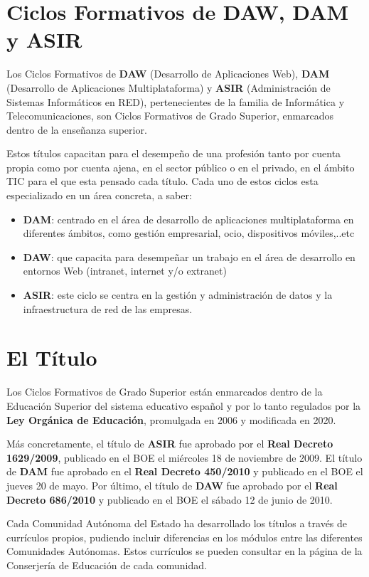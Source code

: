  \section{Ciclos Formativos de DAW, DAM y ASIR}
 Los Ciclos Formativos de {\bfseries DAW} (Desarrollo de Aplicaciones Web), {\bfseries DAM} (Desarrollo de Aplicaciones Multiplataforma) y {\bfseries ASIR} (Administración de Sistemas Informáticos en RED), pertenecientes de la familia de Informática y Telecomunicaciones, son Ciclos Formativos de Grado Superior, enmarcados dentro de la enseñanza superior.
 
 Estos títulos capacitan para el desempeño de una profesión tanto por cuenta propia como por cuenta ajena, en el sector público o en el privado, en el ámbito TIC para el que esta pensado cada título. Cada uno de estos ciclos esta especializado en un área concreta, a saber: 
 
 \begin{itemize}
 	\item {\bfseries DAM}: centrado en el área de desarrollo de aplicaciones multiplataforma en diferentes ámbitos, como gestión empresarial, ocio, dispositivos móviles,..etc
 	\item {\bfseries DAW}: que capacita para desempeñar un trabajo en el área de desarrollo en entornos Web (intranet, internet y/o extranet)
 	\item {\bfseries ASIR}: este ciclo se centra en la gestión y administración de datos y la infraestructura de red de las empresas.
 \end{itemize}
	
\section{El Título}
Los Ciclos Formativos de Grado Superior están enmarcados dentro de la Educación Superior del sistema educativo español y por lo tanto regulados por la {\bfseries Ley Orgánica de Educación}, promulgada en 2006 y modificada en 2020.

Más concretamente, el título de {\bfseries ASIR} fue aprobado por el {\bfseries Real Decreto 1629/2009}, publicado en el BOE el miércoles 18 de noviembre de 2009. El título de {\bfseries DAM} fue aprobado en el {\bfseries Real Decreto 450/2010} y publicado en el BOE el jueves 20 de mayo. Por último, el título de {\bfseries DAW} fue aprobado por el {\bfseries Real Decreto 686/2010} y publicado en el BOE el sábado 12 de junio de 2010. 

Cada Comunidad Autónoma del Estado ha desarrollado los títulos a través de currículos propios, pudiendo incluir diferencias en los módulos entre las diferentes Comunidades Autónomas. Estos currículos se pueden consultar en la página de la Conserjería de Educación de cada comunidad.

